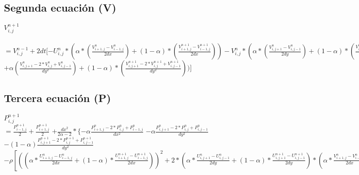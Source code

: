 \documentclass[a4paper]{article}
\begin{document}
\subsection{Segunda ecuación (V)}
$V^{n+1}_{i,j} $
\\
\\
$ = V^{n-1}_{i,j} + 
2dt[-U^{n}_{i,j}*(\alpha * (\frac{V^{n}_{i+1,j} - V^{n}_{i-1,j}}{2dx}) + (1-\alpha) * (\frac{V^{n+1}_{i+1,j} - V^{n+1}_{i-1,j}}{2dx})) 
-V^{n}_{i,j}*(\alpha * (\frac{V^{n}_{i,j+1} - V^{n}_{i,j-1}}{2dy}) + (1-\alpha) * (\frac{V^{n+1}_{i,j+1} - V^{n+1}_{i,j-1}}{2dy})) - \frac{1}{\rho} (\alpha * (\frac{P^{n}_{i,j+1} - P^{n}_{i,j-1}}{2dy}) + (1-\alpha) * (\frac{P^{n+1}_{i,j+1} - P^{n+1}_{i,j-1}}{2dy})) + \nu (\alpha (\frac{ V^{n}_{i+1,j} - 2*V^{n}_{i,j} + V^{n}_{i-1,j}}{dx^2}) + (1-\alpha)*(\frac{V^{n+1}_{i+1,j} - 2*V^{n+1}_{i,j} + V^{n+1}_{i-1,j}}{dx^2})$
\\
$ + \alpha (\frac{ V^{n}_{i,j+1} - 2*V^{n}_{i,j} + V^{n}_{i,j-1}}{dy^2}) + (1-\alpha)*(\frac{ V^{n+1}_{i,j+1} - 2*V^{n+1}_{i,j} + V^{n+1}_{i,j-1}}{dy^2}))]$




\subsection{Tercera ecuación (P)}
 
 $ P^{n+1}_{i,j} $
\\
$= \frac{P^{n+1}_{i-1,j}}{2} + \frac{P^{n+1}_{i+1,j}}{2} $
 $ + \frac{dx^{2}}{2\alpha-2} * \{-\alpha \frac{P^{n}_{i+1,j} -2*P^{n}_{i,j} + P^{n}_{i-1,j}}{dx^{2}}$
 $ -\alpha \frac{P^{n}_{i,j+1} -2*P^{n}_{i,j} + P^{n}_{i,j-1}}{dy^{2}}$ 
 $-(1-\alpha) \frac{P^{n+1}_{i,j+1} -2*P^{n+1}_{i,j} + P^{n+1}_{i,j-1}}{dy^{2}}$
 $ -\rho [ ((\alpha * \frac{U^{n}_{i+1,j} - U^{n}_{i-1,j}}{2dx} + (1-\alpha) * \frac{U^{n+1}_{i+1,j} - U^{n+1}_{i-1,j}}{2dx}))^{2} + 2 * (\alpha * \frac{U^{n}_{i,j+1} - U^{n}_{i,j-1}}{2dy} + (1- \alpha) * \frac{U^{n+1}_{i,j+1} - U^{n+1}_{i,j-1}}{2dy}) * (\alpha * \frac{V^{n}_{i+1,j}-V^{n}_{i-1,j}}{2dx} + (1-\alpha) (\frac{V^{n+1}_{i+1,j}-V^{n+1}_{i-1,j}}{2dx})) + ((\alpha * \frac{V^{n}_{i,j+1} - V^{n}_{i,j-1}}{2dy} + (1-\alpha) * \frac{V^{n+1}_{i,j+1} - V^{n+1}_{i,j-1}}{2dy}))^{2}] \} $
 
 
\end{document}
